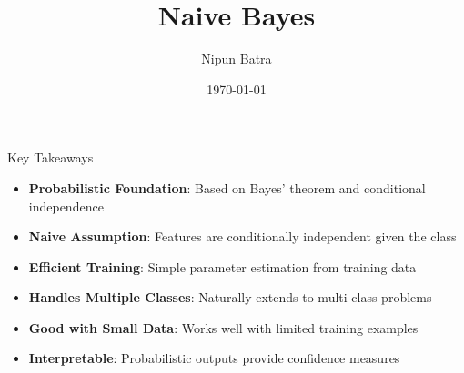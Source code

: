 \documentclass{beamer}
\title{Naive Bayes}
\date{\today}
\author{Nipun Batra}
\institute{IIT Gandhinagar}
\begin{document}
\maketitle


\begin{frame}{Key Takeaways}
\begin{itemize}
\item \textbf{Probabilistic Foundation}: Based on Bayes' theorem and conditional independence
\pause
\item \textbf{Naive Assumption}: Features are conditionally independent given the class
\pause
\item \textbf{Efficient Training}: Simple parameter estimation from training data
\pause
\item \textbf{Handles Multiple Classes}: Naturally extends to multi-class problems
\pause
\item \textbf{Good with Small Data}: Works well with limited training examples
\pause
\item \textbf{Interpretable}: Probabilistic outputs provide confidence measures
\end{itemize}
\end{frame}
\end{document}

